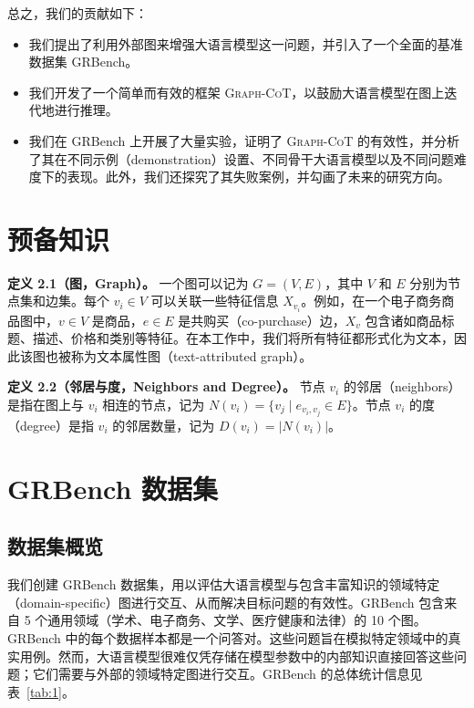 \documentclass[11pt,UTF8,fontset=fandol]{ctexart}
\begin{document}
总之，我们的贡献如下：
\begin{itemize}[leftmargin=1.4em]
\item 我们提出了利用外部图来增强大语言模型这一问题，并引入了一个全面的基准数据集 GRBench。
\item 我们开发了一个简单而有效的框架 \textsc{Graph-CoT}，以鼓励大语言模型在图上迭代地进行推理。
\item 我们在 GRBench 上开展了大量实验，证明了 \textsc{Graph-CoT} 的有效性，并分析了其在不同示例（demonstration）设置、不同骨干大语言模型以及不同问题难度下的表现。此外，我们还探究了其失败案例，并勾画了未来的研究方向。
\end{itemize}

\section{预备知识}

\textbf{定义 2.1（图，Graph）。} 一个图可以记为 $G = (V, E)$，其中 $V$ 和 $E$ 分别为节点集和边集。每个 $v_i \in V$ 可以关联一些特征信息 $X_{v_i}$。例如，在一个电子商务商品图中，$v \in V$ 是商品，$e \in E$ 是共购买（co-purchase）边，$X_v$ 包含诸如商品标题、描述、价格和类别等特征。在本工作中，我们将所有特征都形式化为文本，因此该图也被称为文本属性图（text-attributed graph）。

\textbf{定义 2.2（邻居与度，Neighbors and Degree）。} 节点 $v_i$ 的邻居（neighbors）是指在图上与 $v_i$ 相连的节点，记为 $N(v_i) = \{v_j \mid e_{v_i, v_j} \in E\}$。节点 $v_i$ 的度（degree）是指 $v_i$ 的邻居数量，记为 $D(v_i) = |N(v_i)|$。

\section{GRBench 数据集}

\subsection{数据集概览}

我们创建 GRBench 数据集，用以评估大语言模型与包含丰富知识的领域特定（domain-specific）图进行交互、从而解决目标问题的有效性。GRBench 包含来自 5 个通用领域（学术、电子商务、文学、医疗健康和法律）的 10 个图。GRBench 中的每个数据样本都是一个问答对。这些问题旨在模拟特定领域中的真实用例。然而，大语言模型很难仅凭存储在模型参数中的内部知识直接回答这些问题；它们需要与外部的领域特定图进行交互。GRBench 的总体统计信息见表~\ref{tab:1}。
\end{document}
